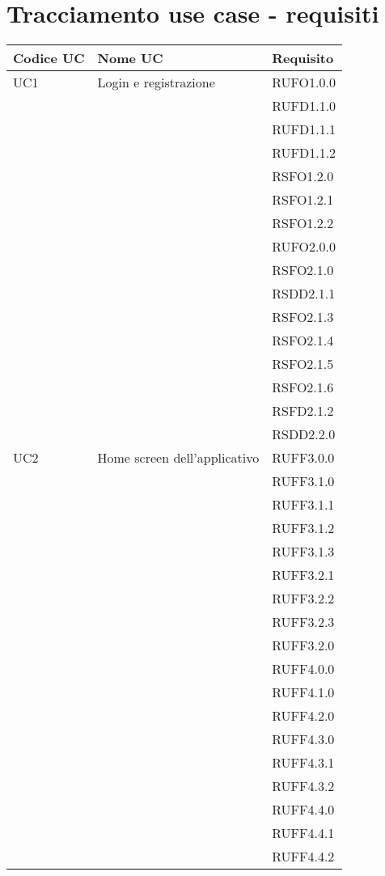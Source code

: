 \newpage\section{Tracciamento use case - requisiti}\label{sec:tracciamento}

\begin{center}
\begin{longtable}{lp{}l}
\toprule Codice UC & Nome UC  & Requisito\\
\midrule
UC1 & Login e registrazione & RUFO1.0.0 \\
 &  & RUFD1.1.0 \\
 &  & RUFD1.1.1 \\
 &  & RUFD1.1.2 \\
 &  & RSFO1.2.0 \\
 &  & RSFO1.2.1 \\
 &  & RSFO1.2.2 \\
 &  & RUFO2.0.0 \\
 &  & RSFO2.1.0 \\
 &  & RSDD2.1.1 \\
 &  & RSFO2.1.3 \\
 &  & RSFO2.1.4 \\
 &  & RSFO2.1.5 \\
 &  & RSFO2.1.6 \\
 &  & RSFD2.1.2 \\
 &  & RSDD2.2.0 \\
UC2 & Home screen dell'applicativo & RUFF3.0.0 \\
 &  & RUFF3.1.0 \\
 &  & RUFF3.1.1 \\
 &  & RUFF3.1.2 \\
 &  & RUFF3.1.3 \\
 &  & RUFF3.2.1 \\
 &  & RUFF3.2.2 \\
 &  & RUFF3.2.3 \\
 &  & RUFF3.2.0 \\
 &  & RUFF4.0.0 \\
 &  & RUFF4.1.0 \\
 &  & RUFF4.2.0 \\
 &  & RUFF4.3.0 \\
 &  & RUFF4.3.1 \\
 &  & RUFF4.3.2 \\
 &  & RUFF4.4.0 \\
 &  & RUFF4.4.1 \\
 &  & RUFF4.4.2 \\

\end{longtable}
\end{center}
